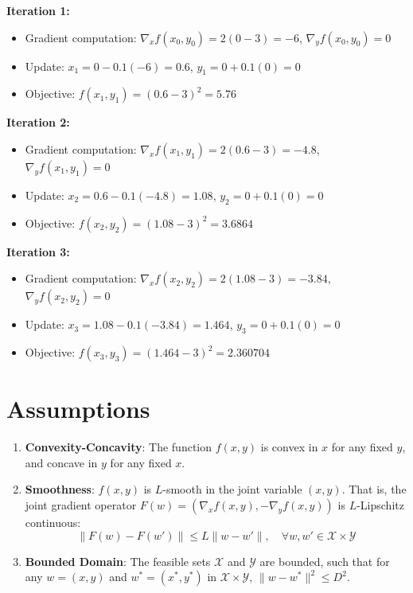 \documentclass{article}
\begin{document}
\textbf{Iteration 1:}
\begin{itemize}
    \item Gradient computation: $\nabla_x f(x_0, y_0) = 2(0-3) = -6$, $\nabla_y f(x_0, y_0) = 0$
    \item Update: $x_1 = 0 - 0.1(-6) = 0.6$, $y_1 = 0 + 0.1(0) = 0$
    \item Objective: $f(x_1, y_1) = (0.6-3)^2 = 5.76$
\end{itemize}

\textbf{Iteration 2:}
\begin{itemize}
    \item Gradient computation: $\nabla_x f(x_1, y_1) = 2(0.6-3) = -4.8$, $\nabla_y f(x_1, y_1) = 0$
    \item Update: $x_2 = 0.6 - 0.1(-4.8) = 1.08$, $y_2 = 0 + 0.1(0) = 0$
    \item Objective: $f(x_2, y_2) = (1.08-3)^2 = 3.6864$
\end{itemize}

\textbf{Iteration 3:}
\begin{itemize}
    \item Gradient computation: $\nabla_x f(x_2, y_2) = 2(1.08-3) = -3.84$, $\nabla_y f(x_2, y_2) = 0$
    \item Update: $x_3 = 1.08 - 0.1(-3.84) = 1.464$, $y_3 = 0 + 0.1(0) = 0$
    \item Objective: $f(x_3, y_3) = (1.464-3)^2 = 2.360704$
\end{itemize}

\newpage
\section*{Assumptions}
\begin{enumerate}
    \item \textbf{Convexity-Concavity}: The function $f(x,y)$ is convex in $x$ for any fixed $y$, and concave in $y$ for any fixed $x$.
    \item \textbf{Smoothness}: $f(x,y)$ is $L$-smooth in the joint variable $(x,y)$. That is, the joint gradient operator $F(w) = (\nabla_x f(x,y), -\nabla_y f(x,y))$ is $L$-Lipschitz continuous:
    $$ \|F(w) - F(w')\| \leq L \|w - w'\|, \quad \forall w, w' \in \mathcal{X} \times \mathcal{Y} $$
    \item \textbf{Bounded Domain}: The feasible sets $\mathcal{X}$ and $\mathcal{Y}$ are bounded, such that for any $w = (x,y)$ and $w^* = (x^*, y^*)$ in $\mathcal{X} \times \mathcal{Y}$, $\|w - w^*\|^2 \leq D^2$.
\end{enumerate}
\end{document}
